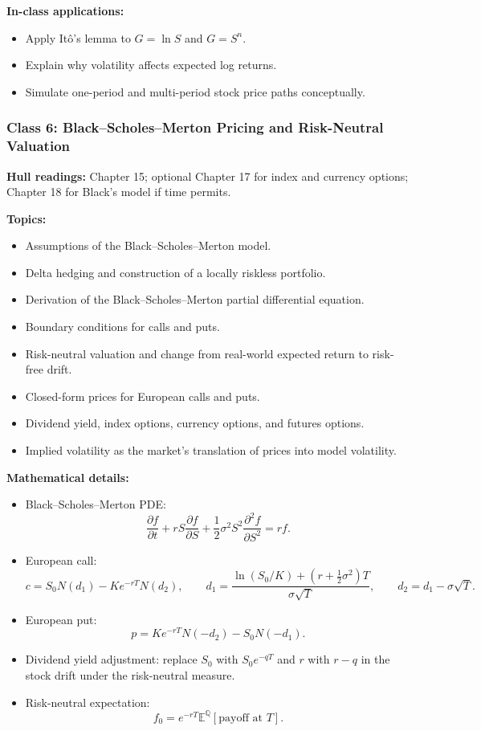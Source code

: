 \documentclass[11pt]{article}
\begin{document}
\textbf{In-class applications:}
\begin{itemize}
    \item Apply It\^o's lemma to $G=\ln S$ and $G=S^n$.
    \item Explain why volatility affects expected log returns.
    \item Simulate one-period and multi-period stock price paths conceptually.
\end{itemize}

\subsubsection*{Class 6: Black--Scholes--Merton Pricing and Risk-Neutral Valuation}
\textbf{Hull readings:} Chapter 15; optional Chapter 17 for index and currency options; Chapter 18 for Black's model if time permits.

\textbf{Topics:}
\begin{itemize}
    \item Assumptions of the Black--Scholes--Merton model.
    \item Delta hedging and construction of a locally riskless portfolio.
    \item Derivation of the Black--Scholes--Merton partial differential equation.
    \item Boundary conditions for calls and puts.
    \item Risk-neutral valuation and change from real-world expected return to risk-free drift.
    \item Closed-form prices for European calls and puts.
    \item Dividend yield, index options, currency options, and futures options.
    \item Implied volatility as the market's translation of prices into model volatility.
\end{itemize}

\textbf{Mathematical details:}
\begin{itemize}
    \item Black--Scholes--Merton PDE:
    \[
        \frac{\partial f}{\partial t}
        +rS\frac{\partial f}{\partial S}
        +\frac{1}{2}\sigma^2S^2\frac{\partial^2f}{\partial S^2}
        =rf.
    \]
    \item European call:
    \[
        c=S_0N(d_1)-Ke^{-rT}N(d_2),
        \qquad
        d_1=\frac{\ln(S_0/K)+(r+\frac{1}{2}\sigma^2)T}{\sigma\sqrt{T}},
        \qquad
        d_2=d_1-\sigma\sqrt{T}.
    \]
    \item European put:
    \[
        p=Ke^{-rT}N(-d_2)-S_0N(-d_1).
    \]
    \item Dividend yield adjustment: replace $S_0$ with $S_0e^{-qT}$ and $r$ with $r-q$ in the stock drift under the risk-neutral measure.
    \item Risk-neutral expectation:
    \[
        f_0=e^{-rT}\mathbb{E}^{\mathbb{Q}}\left[\text{payoff at }T\right].
    \]
\end{itemize}
\end{document}

